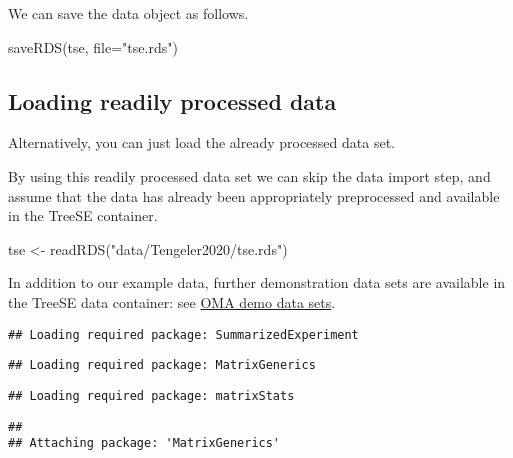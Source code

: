 \documentclass[
  oneside]{book}
\newenvironment{Shaded}{\begin{snugshade}}{\end{snugshade}}
\newcommand{\AttributeTok}[1]{\textcolor[rgb]{0.77,0.63,0.00}{#1}}
\newcommand{\FunctionTok}[1]{\textcolor[rgb]{0.00,0.00,0.00}{#1}}
\newcommand{\NormalTok}[1]{#1}
\newcommand{\OtherTok}[1]{\textcolor[rgb]{0.56,0.35,0.01}{#1}}
\newcommand{\StringTok}[1]{\textcolor[rgb]{0.31,0.60,0.02}{#1}}
\begin{document}
We can save the data object as follows.

\begin{Shaded}
\begin{Highlighting}[]
\FunctionTok{saveRDS}\NormalTok{(tse, }\AttributeTok{file=}\StringTok{"tse.rds"}\NormalTok{)}
\end{Highlighting}
\end{Shaded}

\hypertarget{loading-readily-processed-data}{%
\subsection{Loading readily processed data}\label{loading-readily-processed-data}}

Alternatively, you can just load the already processed data set.

By using this readily processed data set we can skip the data import
step, and assume that the data has already been appropriately
preprocessed and available in the TreeSE container.

\begin{Shaded}
\begin{Highlighting}[]
\NormalTok{tse }\OtherTok{\textless{}{-}} \FunctionTok{readRDS}\NormalTok{(}\StringTok{"data/Tengeler2020/tse.rds"}\NormalTok{)}
\end{Highlighting}
\end{Shaded}

In addition to our example data, further demonstration data sets are
available in the TreeSE data container: see \href{https://microbiome.github.io/OMA/containers.html\#example-data}{OMA demo data
sets}.

\begin{verbatim}
## Loading required package: SummarizedExperiment
\end{verbatim}

\begin{verbatim}
## Loading required package: MatrixGenerics
\end{verbatim}

\begin{verbatim}
## Loading required package: matrixStats
\end{verbatim}

\begin{verbatim}
## 
## Attaching package: 'MatrixGenerics'
\end{verbatim}
\end{document}
